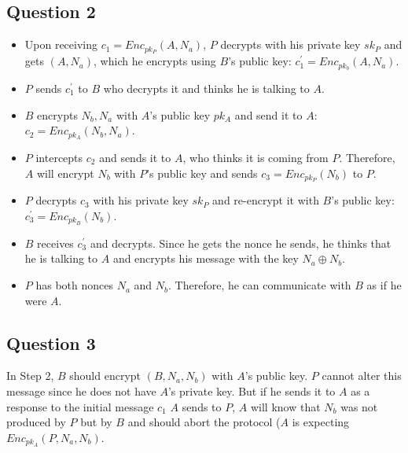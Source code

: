 \documentclass{article}
\begin{document}
\subsection{Question 2}
\begin{itemize}
\item Upon receiving $c_{1}=Enc_{pk_{P}}(A, N_{a})$, $P$ decrypts with his private key $sk_{P}$ and gets $(A, N_{a})$, which he encrypts using $B$'s public key: $c_{1}^{'}=Enc_{pk_{b}}(A, N_{a})$. \item $P$ sends $c_{1}^{'}$ to $B$ who decrypts it and thinks he is talking to $A$.
\item $B$ encrypts $N_{b}, N_{a}$ with $A$'s public key $pk_{A}$ and send it to $A$: $c_{2}=Enc_{pk_{A}}(N_{b}, N_{a})$.
\item $P$  intercepts $c_{2}$ and sends it to $A$, who thinks it is coming from $P$. Therefore, $A$ will encrypt $N_{b}$ with $P$'s public key and sends $c_{3}=Enc_{pk_{P}}(N_{b})$ to $P$. 
\item $P$ decrypts $c_{3}$ with his private key $sk_{P}$ and re-encrypt it with $B$'s public key: $c_{3}^{'}=Enc_{pk_{B}}(N_{b})$. 
\item $B$ receives $c_{3}^{'}$ and decrypts. Since he gets the nonce he sends, he thinks that he is talking to $A$ and encrypts his message with the key $N_{a}\oplus N_{b}$.
\item $P$ has both nonces $N_{a}$ and $N_{b}$. Therefore, he can communicate with $B$ as if he were $A$.
\end{itemize}

\subsection{Question 3}
In Step 2, $B$ should encrypt $(B, N_{a}, N_{b})$ with $A$'s public key. $P$ cannot alter this message since he does not have $A$'s private key. But if he sends it to $A$ as a response to the initial message $c_{1}$ $A$ sends to $P$, $A$ will know that $N_{b}$ was not produced by $P$ but by $B$ and should abort the protocol ($A$ is expecting $Enc_{pk_{A}}(P, N_{a}, N_{b})$. 
\end{document}
